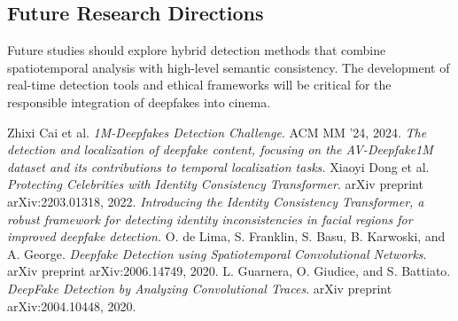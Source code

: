 \documentclass[12pt]{article}
\begin{document}
\subsection{Future Research Directions}
Future studies should explore hybrid detection methods that combine spatiotemporal analysis with high-level semantic consistency. The development of real-time detection tools and ethical frameworks will be critical for the responsible integration of deepfakes into cinema.


\begin{thebibliography}{9}
 Zhixi Cai et al. \textit{1M-Deepfakes Detection Challenge}. ACM MM '24, 2024. \textit{The detection and localization of deepfake content, focusing on the AV-Deepfake1M dataset and its contributions to temporal localization tasks.}
 Xiaoyi Dong et al. \textit{Protecting Celebrities with Identity Consistency Transformer}. arXiv preprint arXiv:2203.01318, 2022. \textit{Introducing the Identity Consistency Transformer, a robust framework for detecting identity inconsistencies in facial regions for improved deepfake detection.}
 O. de Lima, S. Franklin, S. Basu, B. Karwoski, and A. George. \textit{Deepfake Detection using Spatiotemporal Convolutional Networks}. arXiv preprint arXiv:2006.14749, 2020.
 L. Guarnera, O. Giudice, and S. Battiato. \textit{DeepFake Detection by Analyzing Convolutional Traces}. arXiv preprint arXiv:2004.10448, 2020.
\end{thebibliography}
\end{document}
